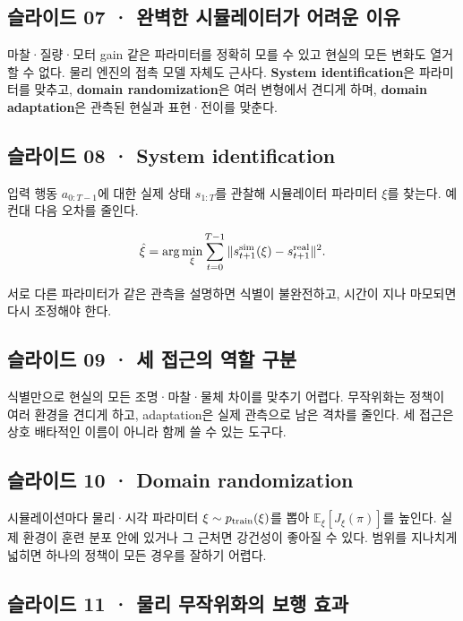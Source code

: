 \documentclass[11pt,a4paper]{article}
\begin{document}
\subsection{슬라이드 07 · 완벽한 시뮬레이터가 어려운 이유}

마찰·질량·모터 gain 같은 파라미터를 정확히 모를 수 있고 현실의 모든 변화도 열거할 수 없다. 물리 엔진의 접촉 모델 자체도 근사다. \textbf{System identification}은 파라미터를 맞추고, \textbf{domain randomization}은 여러 변형에서 견디게 하며, \textbf{domain adaptation}은 관측된 현실과 표현·전이를 맞춘다.\par

\subsection{슬라이드 08 · System identification}

입력 행동 $a_{0:T-1}$에 대한 실제 상태 $s_{1:T}$를 관찰해 시뮬레이터 파라미터 $\xi$를 찾는다. 예컨대 다음 오차를 줄인다.\par

\[
\hat\xi=\arg\min_\xi\sum_{t=0}^{T-1}
\|s^{\rm sim}_{t+1}(\xi)-s^{\rm real}_{t+1}\|^2.
\]

서로 다른 파라미터가 같은 관측을 설명하면 식별이 불완전하고, 시간이 지나 마모되면 다시 조정해야 한다.\par

\subsection{슬라이드 09 · 세 접근의 역할 구분}

식별만으로 현실의 모든 조명·마찰·물체 차이를 맞추기 어렵다. 무작위화는 정책이 여러 환경을 견디게 하고, adaptation은 실제 관측으로 남은 격차를 줄인다. 세 접근은 상호 배타적인 이름이 아니라 함께 쓸 수 있는 도구다.\par

\subsection{슬라이드 10 · Domain randomization}

시뮬레이션마다 물리·시각 파라미터 $\xi\sim p_{\rm train}(\xi)$를 뽑아 $\mathbb E_\xi[J_{\xi}(\pi)]$를 높인다. 실제 환경이 훈련 분포 안에 있거나 그 근처면 강건성이 좋아질 수 있다. 범위를 지나치게 넓히면 하나의 정책이 모든 경우를 잘하기 어렵다.\par

\subsection{슬라이드 11 · 물리 무작위화의 보행 효과}
\end{document}
